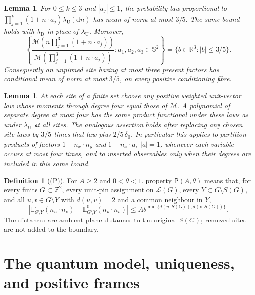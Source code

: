 \documentclass[11pt,reqno]{amsart}
\newtheorem{lemma}[theorem]{Lemma}
\theoremstyle{definition}
\newtheorem{definition}[theorem]{Definition}
\theoremstyle{remark}
\begin{document}
\begin{lemma}\label{l:35}
For \(0\le k\le3\) and \(|a_j|\le1\), the probability law proportional to
\(\prod_{j=1}^k(1+n\cdot a_j)\lambda_{\mathrm U}(\mathrm dn)\)
has mean of norm at most \(3/5\). The same bound holds with
\(\lambda_{\mathrm D}\) in place of \(\lambda_{\mathrm U}\).
Moreover,
\[
 \left\{
 \frac{\mathcal M\!\left(n\prod_{j=1}^3(1+n\cdot a_j)\right)}
      {\mathcal M\!\left(\prod_{j=1}^3(1+n\cdot a_j)\right)}
       :a_1,a_2,a_3\in\mathbb S^2
 \right\}=\{b\in\mathbb R^3:|b|\le3/5\}.
\]
Consequently an unpinned site having at most three present factors
has conditional mean of norm at most \(3/5\), on every positive
conditioning fibre.
\end{lemma}

\begin{lemma}\label{l:exact}
At each site of a finite set choose any positive weighted unit-vector
law whose moments through degree four equal those of \(\mathcal M\).
A polynomial of separate degree at most four has the same product
functional under these laws as under \(\lambda_{\mathrm U}\) at all
sites. The analogous assertion holds after replacing any chosen site
laws by \(3/5\) times that law plus \(2/5\,\delta_0\).
In particular this applies to partition products of factors
\(1\pm n_x\cdot n_y\) and \(1\pm n_x\cdot a\), \(|a|=1\), whenever
each variable occurs at most four times, and to inserted observables
only when their degrees are included in this same bound.
\end{lemma}

\begin{definition}[(P)]\label{h:P}
For \(A\ge2\) and \(0<\theta<1\), property \(\mathsf P(A,\theta)\)
means that, for every finite \(G\subset\mathbb Z^2\), every unit-pin
assignment on \(\mathcal L(G)\), every
\(Y\subset G\setminus S(G)\), and all \(u,v\in G\setminus Y\) with
\(d(u,v)=2\) and a common neighbour in \(Y\),
\[
 \left|\mathbb E^\tau_{G\setminus Y}(n_u\cdot n_v)
             -\mathbb E^0_{G\setminus Y}(n_u\cdot n_v)\right|
 \le A\theta^{\min\{d(u,S(G)),d(v,S(G))\}} .
\]
The distances are ambient plane distances to the original \(S(G)\);
removed sites are not added to the boundary.
\end{definition}


\section{The quantum model, uniqueness, and positive frames}
\end{document}
